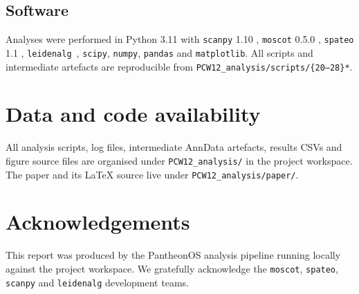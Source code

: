 \documentclass[11pt,a4paper]{article}
\begin{document}
\subsection*{Software}
Analyses were performed in Python 3.11 with
\texttt{scanpy} 1.10 \citep{wolf2018scanpy}, \texttt{moscot} 0.5.0
\citep{klein2025moscot}, \texttt{spateo} 1.1
\citep{qiu2024spateo}, \texttt{leidenalg}~\citep{traag2019leiden},
\texttt{scipy}, \texttt{numpy}, \texttt{pandas} and
\texttt{matplotlib}. All scripts and intermediate
artefacts are reproducible from
\texttt{PCW12\_analysis/scripts/\{20--28\}*}.

\section*{Data and code availability}
All analysis scripts, log files, intermediate AnnData artefacts, results
CSVs and figure source files are organised under
\texttt{PCW12\_analysis/} in the project workspace. The paper and its
LaTeX source live under \texttt{PCW12\_analysis/paper/}.

\section*{Acknowledgements}
This report was produced by the PantheonOS analysis pipeline running
locally against the project workspace. We gratefully acknowledge the
\texttt{moscot}, \texttt{spateo}, \texttt{scanpy} and
\texttt{leidenalg} development teams.


\end{document}
